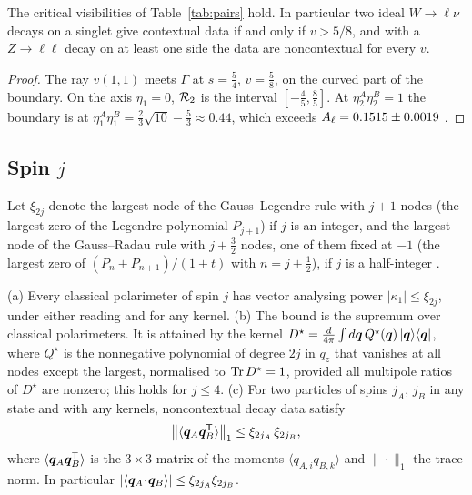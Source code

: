 \begin{corollary}
\label{cor:vis}
The critical visibilities of Table~\ref{tab:pairs} hold. In particular two ideal $W\to\ell\nu$ decays on a singlet give contextual data if and only if $v>5/8$, and with a $Z\to\ell\ell$ decay on at least one side the data are noncontextual for every $v$.
\end{corollary}

\begin{proof}
The ray $v(1,1)$ meets $\Gamma$ at $s=\tfrac54$, $v=\tfrac58$, on the curved part of the boundary. On the axis $\eta_1=0$, $\mathcal{R}_2$ is the interval $[-\tfrac45,\tfrac85]$. At $\eta_2^A\eta_2^B=1$ the boundary is at $\eta_1^A\eta_1^B=\tfrac23\sqrt{10}-\tfrac53\approx0.44$, which exceeds $A_\ell=0.1515\pm0.0019$ \cite{pdg2026}.
\end{proof}

\subsection{Spin $j$}

Let $\xi_{2j}$ denote the largest node of the Gauss--Legendre rule with $j+1$ nodes (the largest zero of the Legendre polynomial $P_{j+1}$) if $j$ is an integer, and the largest node of the Gauss--Radau rule with $j+\tfrac32$ nodes, one of them fixed at $-1$ (the largest zero of $(P_n+P_{n+1})/(1+t)$ with $n=j+\tfrac12$), if $j$ is a half-integer \cite{gautschi2004}.

\begin{theorem}
\label{thm:spinj}
(a) Every classical polarimeter of spin $j$ has vector analysing power $|\kappa_1|\le\xi_{2j}$, under either reading and for any kernel.
(b) The bound is the supremum over classical polarimeters. It is attained by the kernel $D^\star=\frac{d}{4\pi}\int d\bm{q}\,Q^\star(\bm{q})\,|\bm{q}\rangle\langle\bm{q}|$, where $Q^\star$ is the nonnegative polynomial of degree $2j$ in $q_z$ that vanishes at all nodes except the largest, normalised to $\operatorname{Tr} D^\star=1$, provided all multipole ratios of $D^\star$ are nonzero; this holds for $j\le4$.
(c) For two particles of spins $j_A$, $j_B$ in any state and with any kernels, noncontextual decay data satisfy
\begin{equation}
\big\|\langle\bm{q}_A\bm{q}_B^{\mathsf{T}}\rangle\big\|_1\le\xi_{2j_A}\,\xi_{2j_B},
\label{eq:dipole}
\end{equation}
where $\langle\bm{q}_A\bm{q}_B^{\mathsf{T}}\rangle$ is the $3\times3$ matrix of the moments $\langle q_{A,i}q_{B,k}\rangle$ and $\|\cdot\|_1$ the trace norm. In particular $|\langle\bm{q}_A\!\cdot\!\bm{q}_B\rangle|\le\xi_{2j_A}\xi_{2j_B}$.
\end{theorem}


